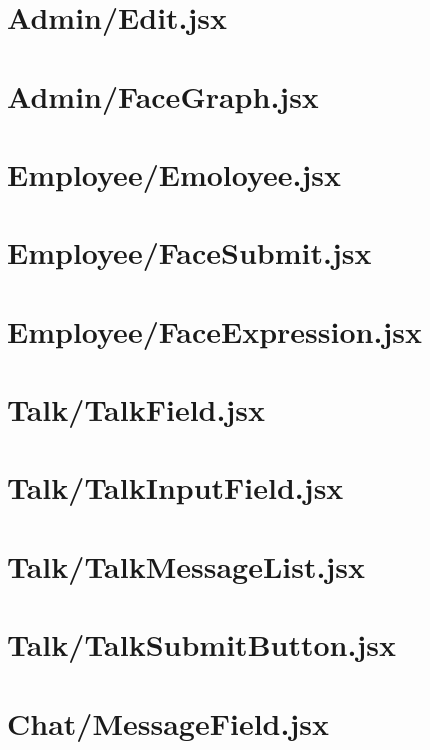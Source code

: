 \section{Admin/Edit.jsx}
{\tiny }

\section{Admin/FaceGraph.jsx}
{\tiny }

\section{Employee/Emoloyee.jsx}
{\tiny }

\section{Employee/FaceSubmit.jsx}
{\tiny }

\section{Employee/FaceExpression.jsx}
{\tiny }

\section{Talk/TalkField.jsx}
{\tiny }

\section{Talk/TalkInputField.jsx}
{\tiny }

\section{Talk/TalkMessageList.jsx}
{\tiny }

\section{Talk/TalkSubmitButton.jsx}
{\tiny }

\section{Chat/MessageField.jsx}
{\tiny }

